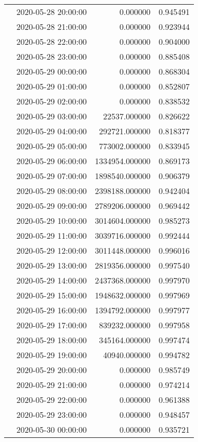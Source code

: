 \begin{tabular}{llrr}
 & 2020-05-28 20:00:00 & 0.000000 & 0.945491 \\
 & 2020-05-28 21:00:00 & 0.000000 & 0.923944 \\
 & 2020-05-28 22:00:00 & 0.000000 & 0.904000 \\
 & 2020-05-28 23:00:00 & 0.000000 & 0.885408 \\
 & 2020-05-29 00:00:00 & 0.000000 & 0.868304 \\
 & 2020-05-29 01:00:00 & 0.000000 & 0.852807 \\
 & 2020-05-29 02:00:00 & 0.000000 & 0.838532 \\
 & 2020-05-29 03:00:00 & 22537.000000 & 0.826622 \\
 & 2020-05-29 04:00:00 & 292721.000000 & 0.818377 \\
 & 2020-05-29 05:00:00 & 773002.000000 & 0.833945 \\
 & 2020-05-29 06:00:00 & 1334954.000000 & 0.869173 \\
 & 2020-05-29 07:00:00 & 1898540.000000 & 0.906379 \\
 & 2020-05-29 08:00:00 & 2398188.000000 & 0.942404 \\
 & 2020-05-29 09:00:00 & 2789206.000000 & 0.969442 \\
 & 2020-05-29 10:00:00 & 3014604.000000 & 0.985273 \\
 & 2020-05-29 11:00:00 & 3039716.000000 & 0.992444 \\
 & 2020-05-29 12:00:00 & 3011448.000000 & 0.996016 \\
 & 2020-05-29 13:00:00 & 2819356.000000 & 0.997540 \\
 & 2020-05-29 14:00:00 & 2437368.000000 & 0.997970 \\
 & 2020-05-29 15:00:00 & 1948632.000000 & 0.997969 \\
 & 2020-05-29 16:00:00 & 1394792.000000 & 0.997977 \\
 & 2020-05-29 17:00:00 & 839232.000000 & 0.997958 \\
 & 2020-05-29 18:00:00 & 345164.000000 & 0.997474 \\
 & 2020-05-29 19:00:00 & 40940.000000 & 0.994782 \\
 & 2020-05-29 20:00:00 & 0.000000 & 0.985749 \\
 & 2020-05-29 21:00:00 & 0.000000 & 0.974214 \\
 & 2020-05-29 22:00:00 & 0.000000 & 0.961388 \\
 & 2020-05-29 23:00:00 & 0.000000 & 0.948457 \\
 & 2020-05-30 00:00:00 & 0.000000 & 0.935721 \\

\end{tabular}
